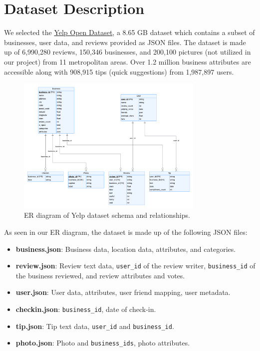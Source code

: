 \section{Dataset Description}

We selected the \href{https://www.yelp.com/dataset}{Yelp Open Dataset}, a 8.65 GB dataset which contains a subset of businesses, user data, and reviews provided as JSON files. The dataset is made up of 6,990,280 reviews, 150,346 businesses, and 200,100 pictures (not utilized in our project) from 11 metropolitan areas. Over 1.2 million business attributes are accessible along with 908,915 tips (quick suggestions) from 1,987,897 users.

\begin{figure}[h!]
    \centering
    \includegraphics[width=0.8\textwidth]{er-diagram.png} %
    \caption{ER diagram of Yelp dataset schema and relationships.}
    \label{fig:example} %
\end{figure}


As seen in our ER diagram, the dataset is made up of the following JSON files:
\begin{itemize}
    \item \textbf{business.json}: Business data, location data, attributes, and categories.
    \item \textbf{review.json}: Review text data, \texttt{user\_id} of the review writer, \texttt{business\_id} of the business reviewed, and review attributes and votes.
    \item \textbf{user.json}: User data, attributes, user friend mapping, user metadata.
    \item \textbf{checkin.json}: \texttt{business\_id}, date of check-in.
    \item \textbf{tip.json}: Tip text data, \texttt{user\_id} and \texttt{business\_id}.
    \item \textbf{photo.json}: Photo and \texttt{business\_ids}, photo attributes.
\end{itemize}

